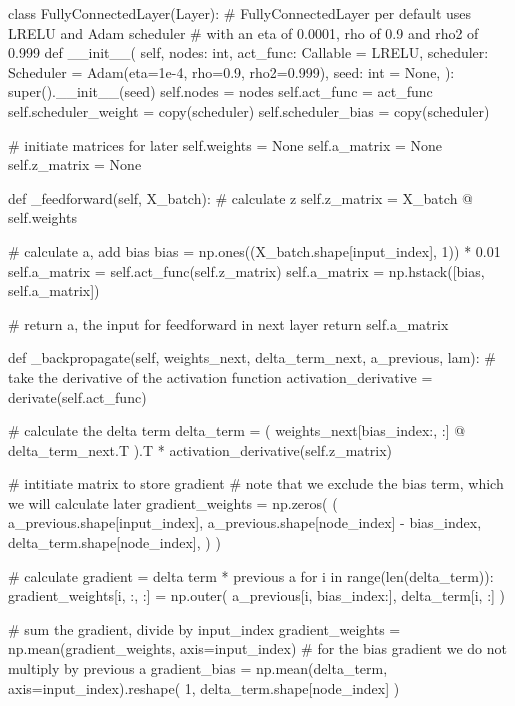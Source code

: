 \documentclass[%
oneside,                 %
final,                   %
10pt]{article}
\begin{document}
\bpycod
class FullyConnectedLayer(Layer):
    # FullyConnectedLayer per default uses LRELU and Adam scheduler
    # with an eta of 0.0001, rho of 0.9 and rho2 of 0.999
    def __init__(
        self,
        nodes: int,
        act_func: Callable = LRELU,
        scheduler: Scheduler = Adam(eta=1e-4, rho=0.9, rho2=0.999),
        seed: int = None,
    ):
        super().__init__(seed)
        self.nodes = nodes
        self.act_func = act_func
        self.scheduler_weight = copy(scheduler)
        self.scheduler_bias = copy(scheduler)

        # initiate matrices for later
        self.weights = None
        self.a_matrix = None
        self.z_matrix = None

    def _feedforward(self, X_batch):
        # calculate z
        self.z_matrix = X_batch @ self.weights

        # calculate a, add bias
        bias = np.ones((X_batch.shape[input_index], 1)) * 0.01
        self.a_matrix = self.act_func(self.z_matrix)
        self.a_matrix = np.hstack([bias, self.a_matrix])

        # return a, the input for feedforward in next layer
        return self.a_matrix

    def _backpropagate(self, weights_next, delta_term_next, a_previous, lam):
        # take the derivative of the activation function
        activation_derivative = derivate(self.act_func)

        # calculate the delta term
        delta_term = (
            weights_next[bias_index:, :] @ delta_term_next.T
        ).T * activation_derivative(self.z_matrix)

        # intitiate matrix to store gradient
        # note that we exclude the bias term, which we will calculate later
        gradient_weights = np.zeros(
            (
                a_previous.shape[input_index],
                a_previous.shape[node_index] - bias_index,
                delta_term.shape[node_index],
            )
        )

        # calculate gradient = delta term * previous a
        for i in range(len(delta_term)):
            gradient_weights[i, :, :] = np.outer(
                a_previous[i, bias_index:], delta_term[i, :]
            )

        # sum the gradient, divide by input_index
        gradient_weights = np.mean(gradient_weights, axis=input_index)
        # for the bias gradient we do not multiply by previous a
        gradient_bias = np.mean(delta_term, axis=input_index).reshape(
            1, delta_term.shape[node_index]
        )
\end{document}
